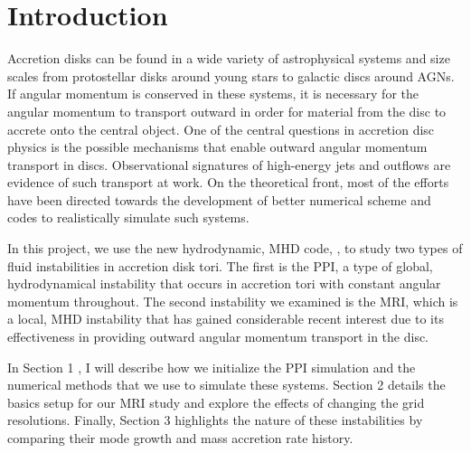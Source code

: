 \documentclass[iop,revtex4]{emulateapj}
\begin{document}
\section{Introduction}\label{sec:intro}
\par Accretion disks can be found in a wide variety of astrophysical systems and size scales from protostellar disks around young stars to galactic discs around AGNs. If angular momentum is conserved in these systems, it is necessary for the angular momentum to transport outward in order for material from the disc to accrete onto the central object. One of the central questions in accretion disc physics is the possible mechanisms that enable outward angular momentum transport in discs. Observational signatures of high-energy jets and outflows are evidence of such transport at work. On the theoretical front, most of the efforts have been directed towards the development of better numerical scheme and codes to realistically simulate such systems. 
\par In this project, we use the new hydrodynamic, \acf{MHD} code, \app, to study two types of fluid instabilities in accretion disk tori. The first is the \acf{PPI}, a type of global, hydrodynamical instability that occurs in accretion tori with constant angular momentum throughout. The second instability we examined is the \ac{MRI}, which is a local, \ac{MHD} instability that has gained considerable recent interest due to its effectiveness in providing outward angular momentum transport in the disc.
\par In Section 1%
, I will describe how we initialize the \ac{PPI} simulation and the numerical methods that we use to simulate these systems. Section 2 %
details the basics setup for our \ac{MRI} study and explore the effects of changing the grid resolutions. Finally, Section 3 %
highlights the nature of these instabilities by comparing their mode growth and mass accretion rate history.%
\end{document}
